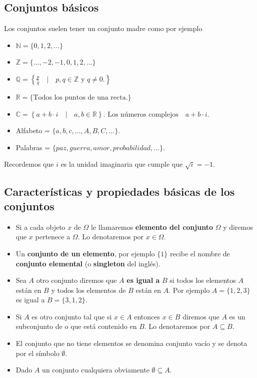 \documentclass[]{book}
\providecommand{\tightlist}{%
  \setlength{\itemsep}{0pt}\setlength{\parskip}{0pt}}
\begin{document}
\hypertarget{conjuntos-buxe1sicos}{%
\subsection{Conjuntos básicos}\label{conjuntos-buxe1sicos}}

Los conjuntos suelen tener un conjunto madre como por ejemplo

\begin{itemize}
\tightlist
\item
  \(\mathbb{N}=\{0,1,2,\ldots\}\)
\item
  \(\mathbb{Z}=\{\ldots,-2,-1,0,1,2,\ldots\}\)
\item
  \(\mathbb{Q}=\left\{\frac{p}{q}\quad\Big|\quad p,q\in \mathbb{Z} \mbox{ y } q \not= 0.\right\}\)
\item
  \(\mathbb{R}=\{\mbox{Todos los puntos de una recta.}\}\)
\item
  \(\mathbb{C}= \left\{a+b\cdot i\quad \big|\quad a,b\in \mathbb{R}\right\}.\mbox{ Los números complejos}\quad a+b\cdot i.\)
\item
  Alfabeto = \(\{a,b,c,\ldots, A,B,C,\ldots\}.\)
\item
  Palabras = \(\{paz, guerra, amor, probabilidad,\ldots\}.\)
\end{itemize}

Recordemos que \(i\) es la unidad imaginaria que cumple que \(\sqrt{i}=-1\).

\hypertarget{caracteruxedsticas-y-propiedades-buxe1sicas-de-los-conjuntos}{%
\subsection{Características y propiedades básicas de los conjuntos}\label{caracteruxedsticas-y-propiedades-buxe1sicas-de-los-conjuntos}}

\begin{itemize}
\tightlist
\item
  Si a cada objeto \(x\) de \(\Omega\) le llamaremos \textbf{elemento del conjunto} \(\Omega\) y diremos que \(x\) pertenece a \(\Omega\). Lo denotaremos por \(x\in \Omega\).
\item
  Un \textbf{conjunto de un elemento}, por ejemplo \(\{1\}\) recibe el nombre de \textbf{conjunto elemental} (o \textbf{singleton} del inglés).
\item
  Sea \(A\) otro conjunto diremos que \(A\) \textbf{es igual a} \(B\) si todos los elementos \(A\) están en \(B\) y todos los elementos de \(B\) están en \(A\). Por ejemplo \(A=\{1,2,3\}\) es igual a \(B=\{3,1,2\}\).
\item
  Si \(A\) es otro conjunto tal que si \(x\in A\) entonces \(x\in B\) diremos que \(A\) es un subconjunto de o que está contenido en \(B\). Lo denotaremos por \(A\subseteq B.\)
\item
  El conjunto que no tiene elementos se denomina conjunto vacío y se denota por el símbolo \(\emptyset\).
\item
  Dado \(A\) un conjunto cualquiera obviamente \(\emptyset\subseteq A.\)
\end{itemize}
\end{document}
